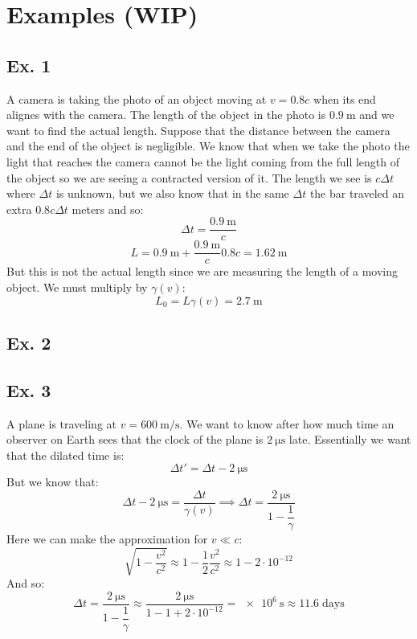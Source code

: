 \section{Examples (WIP)}
\subsection{Ex. 1}
A camera is taking the photo of an object moving at $v = 0.8 c$ when its end alignes with the camera. The length of the object in the photo is $\qty{0.9}{\meter}$ and we want to find the actual length. Suppose that the distance between the camera and the end of the object is negligible. We know that when we take the photo the light that reaches the camera cannot be the light coming from the full length of the object so we are seeing a contracted version of it. The length we see is $c \Delta t$ where $\Delta t$ is unknown, but we also know that in the same $\Delta t$ the bar traveled an extra $0.8 c \Delta t$ meters and so:
\begin{equation}
  \Delta t = \dfrac{\qty{0.9}{\meter}}{c}
\end{equation}
\begin{equation}
  L = \qty{0.9}{\meter} + \dfrac{\qty{0.9}{\meter}}{c}0.8 c = \qty{1.62}{\meter}
\end{equation}
But this is not the actual length since we are measuring the length of a moving object. We must multiply by $\gamma(v)$:
\begin{equation}
  L_0 = L \gamma(v) = \qty{2.7}{\meter}
\end{equation}
\subsection{Ex. 2}
\subsection{Ex. 3}
A plane is traveling at $v = \qty{600}{\meter\per\second}$. We want to know after how much time an observer on Earth sees that the clock of the plane is $\qty{2}{\micro\second}$ late. Essentially we want that the dilated time is:
\begin{equation}
  \Delta t' = \Delta t - \qty{2}{\micro\second}
\end{equation}
But we know that:
\begin{equation}
  \Delta t - \qty{2}{\micro\second} = \dfrac{\Delta t}{\gamma(v)} \implies \Delta t = \dfrac{\qty{2}{\micro\second}}{1-\dfrac{1}{\gamma}}
\end{equation}
Here we can make the approximation for $v\ll c$:
\begin{equation}
  \sqrt{1-\dfrac{v^2}{c^2}} \approx 1 - \dfrac{1}{2}\dfrac{v^2}{c^2} \approx 1 - 2 \cdot 10^{-12}
\end{equation}
And so:
\begin{equation}
  \Delta t = \dfrac{\qty{2}{\micro\second}}{1-\dfrac{1}{\gamma}} \approx \dfrac{\qty{2}{\micro\second}}{1-1 + 2 \cdot 10^{-12}} = \qty{e6}{\second} \approx 11.6\;\text{days}
\end{equation}
